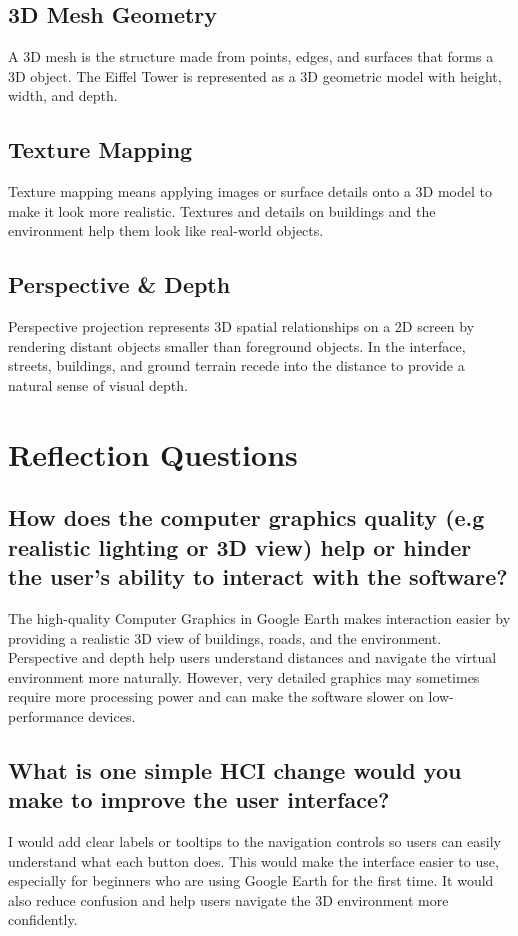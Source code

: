 \documentclass[12pt,a4paper]{article}
\begin{document}
\subsection{3D Mesh Geometry}

A 3D mesh is the structure made from points, edges, and surfaces
that forms a 3D object. The Eiffel Tower is represented as a 3D
geometric model with height, width, and depth.

\subsection{Texture Mapping}

Texture mapping means applying images or surface details onto a 3D
model to make it look more realistic. Textures and details on buildings and
the environment help them look like real-world objects.

\subsection{Perspective \& Depth}

Perspective projection represents 3D spatial relationships on a 2D screen by rendering distant objects smaller than foreground objects. In the interface, streets, buildings, and ground terrain recede into the distance to provide a natural sense of visual depth.

\section{Reflection Questions}

\subsection{How does the computer graphics quality (e.g realistic lighting or 3D view) help or hinder the user's ability to interact with the software?}
The high-quality Computer Graphics in Google Earth makes interaction easier by
providing a realistic 3D view of buildings, roads, and the environment. Perspective and
depth help users understand distances and navigate the virtual environment more
naturally. However, very detailed graphics may sometimes require more processing
power and can make the software slower on low-performance devices.

\subsection{What is one simple HCI change would you make to improve the user interface?}
I would add clear labels or tooltips to the navigation controls so users can easily
understand what each button does. This would make the interface easier to use, especially
for beginners who are using Google Earth for the first time. It would also reduce
confusion and help users navigate the 3D environment more confidently.
\end{document}
